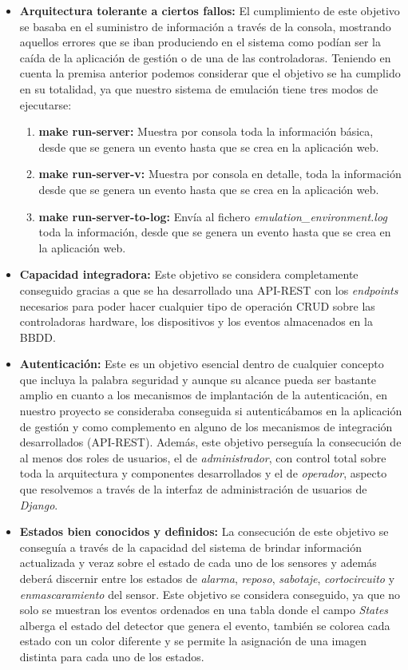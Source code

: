 \begin{itemize}
\item \textbf{Arquitectura tolerante a ciertos fallos:} El cumplimiento de este objetivo se basaba en el suministro de información a través de la consola, mostrando aquellos errores que se iban produciendo en el sistema como podían ser la caída de la aplicación de gestión o de una de las controladoras. Teniendo en cuenta la premisa anterior podemos considerar que el objetivo se ha cumplido en su totalidad, ya que nuestro sistema de emulación tiene tres modos de ejecutarse: 
\begin{enumerate}
\item \textbf{make run-server:} Muestra por consola toda la información básica, desde que se genera un evento hasta que se crea en la aplicación web.
\item \textbf{make run-server-v:} Muestra por consola en detalle, toda la información desde que se genera un evento hasta que se crea en la aplicación web.
\item \textbf{make run-server-to-log:} Envía al fichero \textit{emulation\_environment.log} toda la información, desde que se genera un evento hasta que se crea en la aplicación web.
\end{enumerate}

\item \textbf{Capacidad integradora:} Este objetivo se considera completamente conseguido gracias a que se ha desarrollado una \acs{API}-\acs{REST} con los \textit{endpoints} necesarios para poder hacer cualquier tipo de operación \acs{CRUD} sobre las controladoras hardware, los dispositivos y los eventos almacenados en la \acs{BBDD}.

\item \textbf{Autenticación:} Este es un objetivo esencial dentro de cualquier concepto que incluya la palabra seguridad y aunque su alcance pueda ser bastante amplio en cuanto a los mecanismos de implantación de la autenticación, en nuestro proyecto se consideraba conseguida si autenticábamos en la aplicación de gestión y como complemento en alguno de los mecanismos de integración desarrollados (\acs{API}-\acs{REST}). Además, este objetivo perseguía la consecución de al menos dos roles de usuarios, el de \textit{administrador}, con control total sobre toda la arquitectura y componentes desarrollados y el de \textit{operador}, aspecto que resolvemos a través de la interfaz de administración de usuarios de \textit{Django}.

\item \textbf{Estados bien conocidos y definidos:} La consecución de este objetivo se conseguía a través de la capacidad del sistema de brindar información actualizada y veraz sobre el estado de cada uno de los sensores y además deberá discernir entre los estados de \textit{alarma}, \textit{reposo}, \textit{sabotaje}, \textit{cortocircuito} y \textit{enmascaramiento} del sensor. Este objetivo se considera conseguido, ya que no solo se muestran los eventos ordenados en una tabla donde el campo \textit{States} alberga el estado del detector que genera el evento, también se colorea cada estado con un color diferente y se permite la asignación de una imagen distinta para cada uno de los estados.


\end{itemize}
